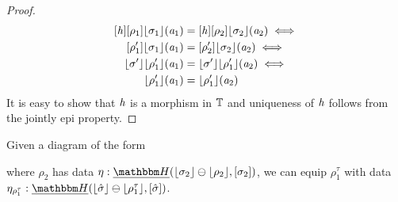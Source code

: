 \begin{proof}
\begin{align*}
        \anyL\vh\anyL{\rho_1}\concL{\sigma_1}(\va_1) &= \anyL\vh\anyL{\rho_2}\concL{\sigma_2}(\va_2) \iff \\
        \anyL{\rho_1'}\concL{\sigma_1}(\va_1) &= \anyL{\rho_2'}\concL{\sigma_2}(\va_2) \iff \\
        \concL{\sigma'}\concL{\rho_1'}(\va_1) &= \concL{\sigma'}\concL{\rho_1'}(\va_2) \iff \\
        \concL{\rho_1'}(\va_1) &= \concL{\rho_1'}(\va_2)
    \end{align*}
    It is easy to show that $\mathit{h}$ is a morphism in $\mathbb{T}$ and uniqueness of $\mathit{h}$ follows from the jointly epi property. 
\end{proof}

\begin{lemma}\label{lem:gen-cospan-data}
    Given a diagram of the form 
         where $\rho_2$ has data $\mvarM : \dheapF(\concL{\sigma_2} \ominus \concL{\rho_2}, \anyL{\sigma_2})$,
        we can equip $\rho^\tau_1$ with data $\eta_{\rho^\tau_1} : \dheapF(\concL{\hat\sigma} \ominus \concL{\rho^\tau_1}, \anyL{\hat\sigma})$.
\end{lemma}
